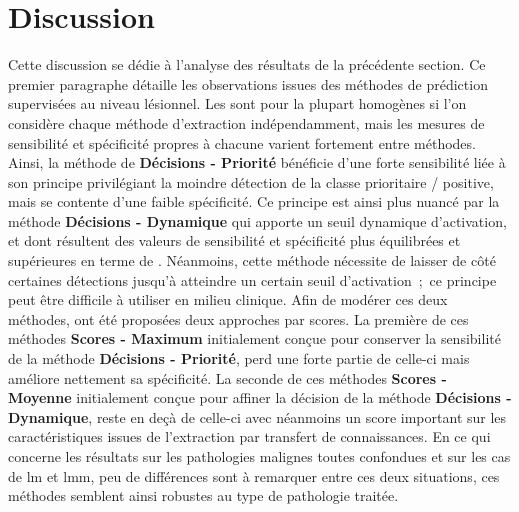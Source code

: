 \section{Discussion}
Cette discussion se dédie à l'analyse des résultats de la précédente section. Ce premier paragraphe détaille les observations issues des méthodes de prédiction supervisées au niveau lésionnel. Les \fscore{} sont pour la plupart homogènes si l'on considère chaque méthode d'extraction indépendamment, mais les mesures de sensibilité et spécificité propres à chacune varient fortement entre méthodes. Ainsi, la méthode de \textbf{Décisions - Priorité} bénéficie d'une forte sensibilité liée à son principe privilégiant la moindre détection de la classe prioritaire / positive, mais se contente d'une faible spécificité. Ce principe est ainsi plus nuancé par la méthode \textbf{Décisions - Dynamique} qui apporte un seuil dynamique d'activation, et dont résultent des valeurs de sensibilité et spécificité plus équilibrées et supérieures en terme de \fscore{}. Néanmoins, cette méthode nécessite de laisser de côté certaines détections jusqu'à atteindre un certain seuil d'activation~;~ce principe peut être difficile à utiliser en milieu clinique. Afin de modérer ces deux méthodes, ont été proposées deux approches par scores. La première de ces méthodes \textbf{Scores - Maximum} initialement conçue pour conserver la sensibilité de la méthode \textbf{Décisions - Priorité}, perd une forte partie de celle-ci mais améliore nettement sa spécificité. La seconde de ces méthodes \textbf{Scores - Moyenne} initialement conçue pour affiner la décision de la méthode \textbf{Décisions - Dynamique}, reste en deçà de celle-ci avec néanmoins un score important sur les caractéristiques issues de l'extraction par transfert de connaissances. En ce qui concerne les résultats sur les pathologies malignes toutes confondues et sur les cas de \gls{lm} et \gls{lmm}, peu de différences sont à remarquer entre ces deux situations, ces méthodes semblent ainsi robustes au type de pathologie traitée.\par

